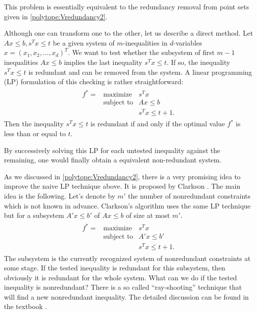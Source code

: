 \documentclass[a4paper,12pt]{article}
\begin{document}
This problem is essentially equivalent to the redundancy
removal from point sets given in \ref{polytope:Vredundancy2}.

Although one can transform one to the other, let us describe
a direct method.  Let $A x \le b, s^T x \le t$ be a given system of $m$-inequalities in $d$-variables $x=(x_1,x_2,\ldots,x_d)^T$.
We want to test whether the subsystem of first $m-1$ inequalities $A x \le b$ 
implies the last inequality $s^T x \le t$.  If so,
the inequality $s^T x \le t$ is redundant 
and can be removed from the system.
  A linear programming (LP)
formulation of this checking is rather straightforward:
\begin{align} \label{eq:Hredundancy_lp1}
\begin{array}{lll}
f^* = &\text{maximize}    & s^T x\\
&\text{subject to}  & A x \le b
\\  
&                   & s^T x  \le  t+1.
\end{array}
\end{align}
Then the inequality $s^T x \le t$ is redundant if and only if
the optimal value $f^*$ is less than or equal to $t$.

By successively solving this LP for each untested inequality 
against the remaining,
one would finally obtain a equivalent non-redundant system. 

As we discussed in \ref{polytope:Vredundancy2}, there is
a very promising idea to improve the naive LP technique above.
It is proposed by Clarkson  \cite{c-mosga-94} .
The main idea is the following.  Let's denote by $m'$ the number of 
nonredundant constraints which is not known in advance.  Clarkson's algorithm uses
the same LP technique but for a subsystem $A' x \le b'$ of $A x \le b$
of size at most $m'$.
\begin{align} \label{eq:Hredundancy_Clarkson}
\begin{array}{lll}
f^* = &\text{maximize}    & s^T x\\
&\text{subject to}  & A' x \le b'
\\  
&                   & s^T x  \le  t+1.
\end{array}
\end{align}
The subsystem is the currently recognized system of  nonredundant
constraints at some stage.  If the tested inequality is redundant for
this subsystem, then obviously it is redundant for the whole system.
What can we do if the tested inequality is nonredundant?   There is
a so called ``ray-shooting'' technique that will find a new nonredundant
inequality.  The detailed discussion can be found in the textbook \cite[Chap 7]{f-pc-20}.
\end{document}
